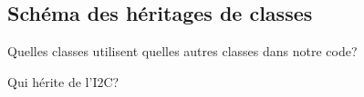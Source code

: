 \documentclass[10pt,a4paper,final]{article}
\begin{document}
\begin{spacing}{1.5}
\begin{figure}[hbtp]
\subsection{Schéma des héritages de classes}
Quelles classes utilisent quelles autres classes dans notre code?
\caption{Héritage de la classe de contrôle du véhicule}
\centering
{}
\caption{Héritage de la classe de contrôle de la station no.1}
\caption{Qui hérite du SPI?}
\caption{Qui hérite de l'I2C?}
\end{figure}

\vfill
\pagebreak


\end{spacing}
\end{document}
